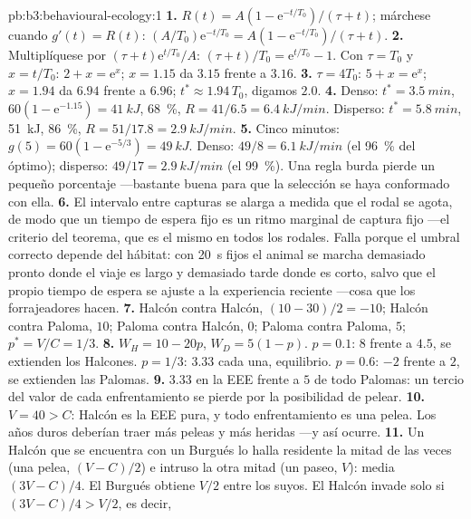 \begin{solution}{pb:b3:behavioural-ecology:1}
\textbf{1.} $R(t) = A(1 - \mathrm{e}^{-t/T_{0}})/(\tau + t)$; márchese
cuando $g'(t) = R(t)$: $(A/T_{0})\mathrm{e}^{-t/T_{0}} = A(1 - \mathrm{e}^{-t/T_{0}})/
(\tau + t)$.
\textbf{2.} Multiplíquese por $(\tau + t)\mathrm{e}^{t/T_{0}}/A$: $(\tau + t)/T_{0}
= \mathrm{e}^{t/T_{0}} - 1$. Con $\tau = T_{0}$ y $x = t/T_{0}$: $2 + x =
\mathrm{e}^{x}$; $x = 1.15$ da $3.15$ frente a $3.16$.
\textbf{3.} $\tau = 4T_{0}$: $5 + x = \mathrm{e}^{x}$; $x = 1.94$ da
$6.94$ frente a $6.96$; $t^{*} \approx 1.94\,T_{0}$, digamos $2.0$.
\textbf{4.} Denso: $t^{*} = \qty{3.5}{min}$, $60(1 - \mathrm{e}^{-1.15}) =
\qty{41}{kJ}$, \qty{68}{\%}, $R = 41/6.5 = \qty{6.4}{kJ/min}$. Disperso:
$t^{*} = \qty{5.8}{min}$, \qty{51}{kJ}, \qty{86}{\%}, $R = 51/17.8 =
\qty{2.9}{kJ/min}$.
\textbf{5.} Cinco minutos: $g(5) = 60(1 - \mathrm{e}^{-5/3}) = \qty{49}{kJ}$.
Denso: $49/8 = \qty{6.1}{kJ/min}$ (el \qty{96}{\%} del óptimo);
disperso: $49/17 = \qty{2.9}{kJ/min}$ (el \qty{99}{\%}). Una regla burda
pierde un pequeño porcentaje ---bastante buena para que la selección se
haya conformado con ella.
\textbf{6.} El intervalo entre capturas se alarga a medida que el rodal
se agota, de modo que un tiempo de espera fijo es un ritmo marginal de
captura fijo ---el criterio del teorema, que es el mismo en todos los
rodales. Falla porque el umbral correcto depende del hábitat: con
\qty{20}{s} fijos el animal se marcha demasiado pronto donde el viaje
es largo y demasiado tarde donde es corto, salvo que el propio tiempo
de espera se ajuste a la experiencia reciente ---cosa que los
forrajeadores hacen.
\textbf{7.} Halcón contra Halcón, $(10 - 30)/2 = -10$; Halcón contra
Paloma, $10$; Paloma contra Halcón, $0$; Paloma contra Paloma, $5$;
$p^{*} = V/C = 1/3$.
\textbf{8.} $W_{H} = 10 - 20p$, $W_{D} = 5(1 - p)$. $p = 0.1$: $8$ frente
a $4.5$, se extienden los Halcones. $p = 1/3$: $3.33$ cada una,
equilibrio. $p = 0.6$: $-2$ frente a $2$, se extienden las Palomas.
\textbf{9.} $3.33$ en la EEE frente a $5$ de todo Palomas: un tercio del
valor de cada enfrentamiento se pierde por la posibilidad de pelear.
\textbf{10.} $V = 40 > C$: Halcón es la EEE pura, y todo enfrentamiento
es una pelea. Los años duros deberían traer más peleas y más heridas
---y así ocurre.
\textbf{11.} Un Halcón que se encuentra con un Burgués lo halla
residente la mitad de las veces (una pelea, $(V - C)/2$) e intruso la
otra mitad (un paseo, $V$): media $(3V - C)/4$. El Burgués obtiene $V/2$
entre los suyos. El Halcón invade solo si $(3V - C)/4 > V/2$, es decir,

\end{solution}

